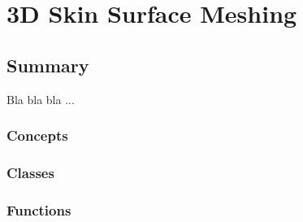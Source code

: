 
\chapter{3D Skin Surface Meshing}
\label{chapterSkinSurfaceRef}

\section*{Summary}

Bla bla bla ...

\subsection*{Concepts}


\subsection*{Classes}


\subsection*{Functions}




